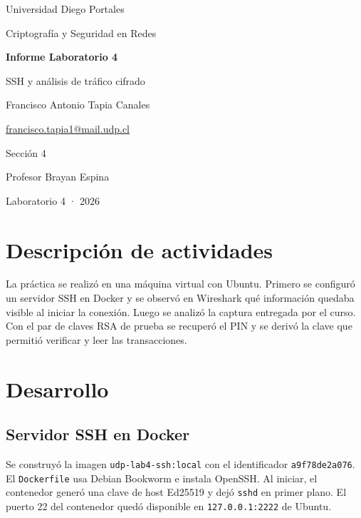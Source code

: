 \documentclass[letterpaper,11pt]{article}
\begin{document}
\begin{titlepage}
\centering
\vspace*{1.6cm}
{\large Universidad Diego Portales\par}
{Criptografía y Seguridad en Redes\par}
\vspace{2.2cm}
{\Huge\bfseries Informe Laboratorio 4\par}
\vspace{0.4cm}
{\Large SSH y análisis de tráfico cifrado\par}
\vspace{1.2cm}
{\large Francisco Antonio Tapia Canales\par}
\href{mailto:francisco.tapia1@mail.udp.cl}{francisco.tapia1@mail.udp.cl}\par
\vspace{0.5cm}
Sección 4\par
Profesor Brayan Espina\par
\vfill
Laboratorio 4 · 2026\par
\vspace{0.9cm}
\end{titlepage}
\tableofcontents
\clearpage

\section{Descripción de actividades}
La práctica se realizó en una máquina virtual con Ubuntu. Primero se configuró un servidor SSH en Docker y se observó en Wireshark qué información quedaba visible al iniciar la conexión. Luego se analizó la captura entregada por el curso. Con el par de claves RSA de prueba se recuperó el PIN y se derivó la clave que permitió verificar y leer las transacciones.

\section{Desarrollo}

\subsection{Servidor SSH en Docker}
Se construyó la imagen \texttt{udp-lab4-ssh:local} con el identificador \texttt{a9f78de2a076}. El \texttt{Dockerfile} usa Debian Bookworm e instala OpenSSH. Al iniciar, el contenedor generó una clave de host Ed25519 y dejó \texttt{sshd} en primer plano. El puerto 22 del contenedor quedó disponible en \texttt{127.0.0.1:2222} de Ubuntu.
\end{document}
